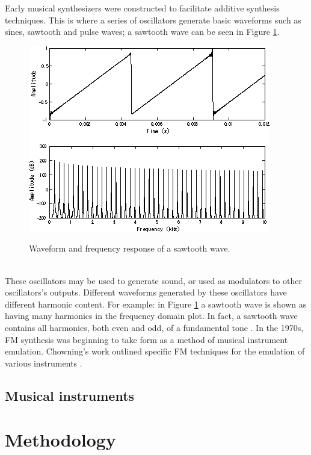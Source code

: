 \documentclass{article}
\begin{document}
        Early musical synthesizers were constructed to facilitate additive synthesis techniques.
        This is where a series of oscillators generate basic waveforms such as sines, sawtooth and pulse waves; a sawtooth wave can be seen in Figure \ref{sawtooth}.
        \begin{figure}[h]
            \includegraphics[scale=0.6]{images/Sawtooth.png}%
            \centering
            \caption{Waveform and frequency response of a sawtooth wave.}\cite{kraft2017lp}
            \label{sawtooth}
        \end{figure}
        \\
        These oscillators may be used to generate sound, or used as modulators to other oscillators's outputs.
        Different waveforms generated by these oscillators have different harmonic content.
        For example: in Figure \ref{sawtooth} a sawtooth wave is shown as having many harmonics in the frequency domain plot.
        In fact, a sawtooth wave contains all harmonics, both even and odd, of a fundamental tone \cite{roederer1995physics}.
        In the 1970s, FM synthesis was beginning to take form as a method of musical instrument emulation. Chowning's work outlined specific FM techniques for the emulation of various instruments \cite{chowning1973synthesis}.
        
    \subsection{Musical instruments}

\section{Methodology}
\end{document}
